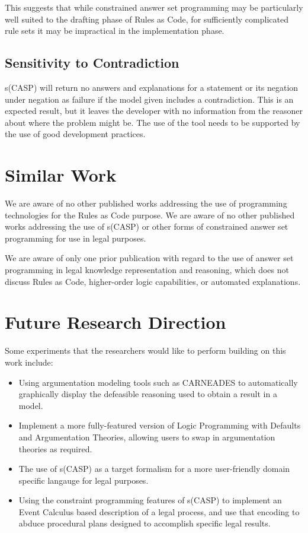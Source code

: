 \documentclass[sigconf]{acmart}
\begin{document}
This suggests that while constrained answer set programming may be particularly well suited to the drafting phase of
Rules as Code, for sufficiently complicated rule sets it may be impractical in the implementation phase.

\subsection{Sensitivity to Contradiction}
s(CASP) will return no answers and explanations for a statement
or its negation under negation as failure if the model given
includes a contradiction. This is an expected result, but it leaves the
developer with no information from the reasoner about where the problem
might be. The use of the tool needs to be supported by the use of good
development practices.

\section{Similar Work}

We are aware of no other published works addressing the use of programming technologies for the Rules as Code
purpose. We are aware of no other published works addressing the use of s(CASP) or other forms of 
constrained answer set programming for use in legal purposes.

We are aware of only one prior publication with regard to the use of answer set programming in legal
knowledge representation and reasoning, which does not discuss Rules as Code, higher-order logic
capabilities, or automated explanations.

\section{Future Research Direction}

Some experiments that the researchers would like to perform building on this work
include:
\begin{itemize}
    \item Using argumentation modeling tools such as CARNEADES to automatically graphically
    display the defeasible reasoning used to obtain a result in a model.
    \item Implement a more fully-featured version of Logic Programming with
    Defaults and Argumentation Theories, allowing users to swap in argumentation
    theories as required.
    \item The use of s(CASP) as a target formalism for a more user-friendly
    domain specific langauge for legal purposes.
    \item Using the constraint programming features of s(CASP) to implement
    an Event Calculus based description of a legal process, and use that encoding
    to abduce procedural plans designed to accomplish specific legal results.
\end{itemize}
\end{document}
